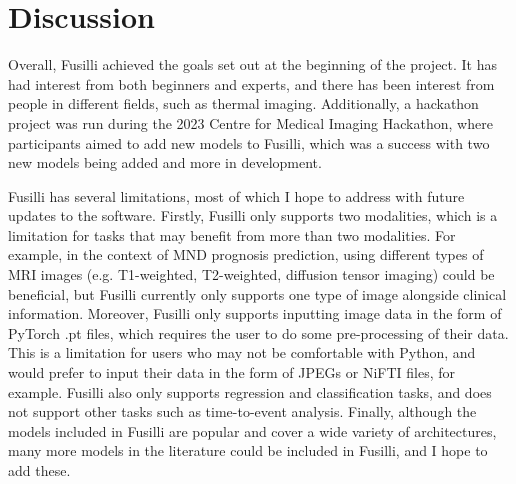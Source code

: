 \section{Discussion}

Overall, Fusilli achieved the goals set out at the beginning of the project.
It has had interest from both beginners and experts, and there has been interest from people in different fields, such as thermal imaging.
Additionally, a hackathon project was run during the 2023 Centre for Medical Imaging Hackathon, where participants aimed to add new models to Fusilli, which was a success with two new models being added and more in development.

Fusilli has several limitations, most of which I hope to address with future updates to the software.
Firstly, Fusilli only supports two modalities, which is a limitation for tasks that may benefit from more than two modalities.
For example, in the context of MND prognosis prediction, using different types of MRI images (e.g. T1-weighted, T2-weighted, diffusion tensor imaging) could be beneficial, but Fusilli currently only supports one type of image alongside clinical information.
Moreover, Fusilli only supports inputting image data in the form of PyTorch .pt files, which requires the user to do some pre-processing of their data.
This is a limitation for users who may not be comfortable with Python, and would prefer to input their data in the form of JPEGs or NiFTI files, for example.
Fusilli also only supports regression and classification tasks, and does not support other tasks such as time-to-event analysis.
Finally, although the models included in Fusilli are popular and cover a wide variety of architectures, many more models in the literature could be included in Fusilli, and I hope to add these.

